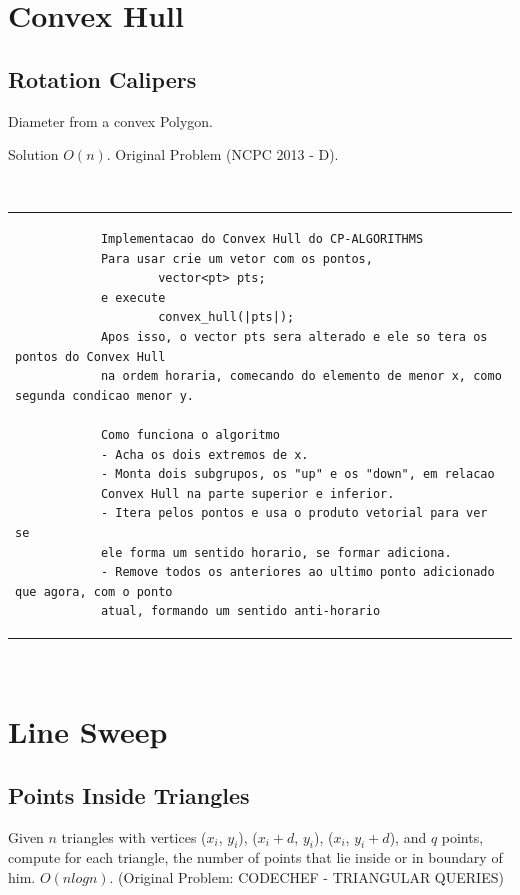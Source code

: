     \section{Convex Hull}
        \subsection{Rotation Calipers}
        Diameter from a convex Polygon.
        
        Solution $O(n)$. Original Problem (NCPC 2013 - D).
        
        \ \\
        
        \begin{tabular}{|p{31cm}|}
          \begin{verbatim}
            Implementacao do Convex Hull do CP-ALGORITHMS
            Para usar crie um vetor com os pontos,
            		vector<pt> pts;
            e execute
            		convex_hull(|pts|);
            Apos isso, o vector pts sera alterado e ele so tera os pontos do Convex Hull 
            na ordem horaria, comecando do elemento de menor x, como segunda condicao menor y.
            
            Como funciona o algoritmo
            - Acha os dois extremos de x.
            - Monta dois subgrupos, os "up" e os "down", em relacao
            Convex Hull na parte superior e inferior.
            - Itera pelos pontos e usa o produto vetorial para ver se
            ele forma um sentido horario, se formar adiciona.
            - Remove todos os anteriores ao ultimo ponto adicionado que agora, com o ponto
            atual, formando um sentido anti-horario
            \end{verbatim}
        \end{tabular}
        \\
        
        
        
    \section{Line Sweep}
        \subsection{Points Inside Triangles}
        Given $n$ triangles with vertices {($x_i$, $y_i$), ($x_i + d$, $y_i$), ($x_i$, $y_i + d$)}, and $q$ points, compute for each triangle, the number of points that lie inside or in boundary of him. $O(nlogn)$. (Original Problem: CODECHEF - TRIANGULAR QUERIES)
        
        \newpage
